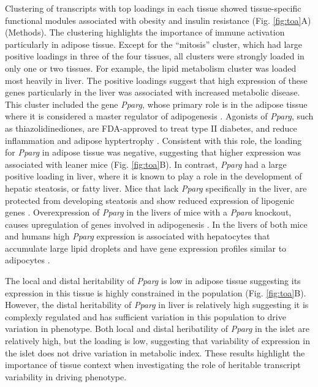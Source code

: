 \documentclass[
]{article}
\begin{document}
Clustering of transcripts with top loadings in each tissue showed
tissue-specific functional modules associated with obesity and insulin
resistance (Fig. \ref{fig:toa}A) (Methods). The clustering highlights
the importance of immune activation particularly in adipose tissue.
Except for the ``mitosis'' cluster, which had large positive loadings in
three of the four tissues, all clusters were strongly loaded in only one
or two tissues. For example, the lipid metabolism cluster was loaded
most heavily in liver. The positive loadings suggest that high
expression of these genes particularly in the liver was associated with
increased metabolic disease. This cluster included the gene
\textit{Pparg}, whose primary role is in the adipose tissue where it is
considered a master regulator of adipogenesis \cite{pmid17389767}.
Agonists of \textit{Pparg}, such as thiazolidinediones, are FDA-approved
to treat type II diabetes, and reduce inflammation and adipose
hyptertrophy \cite{pmid17389767}. Consistent with this role, the loading
for \textit{Pparg} in adipose tissue was negative, suggesting that
higher expression was associated with leaner mice (Fig. \ref{fig:toa}B).
In contrast, \textit{Pparg} had a large positive loading in liver, where
it is known to play a role in the development of hepatic steatosis, or
fatty liver. Mice that lack \textit{Pparg} specifically in the liver,
are protected from developing steatosis and show reduced expression of
lipogenic genes \cite{pmid12805374, pmid12618528}. Overexpression of
\textit{Pparg} in the livers of mice with a \textit{Ppara} knockout,
causes upregulation of genes involved in adipogenesis
\cite{pmid16357043}. In the livers of both mice and humans high
\textit{Pparg} expression is associated with hepatocytes that accumulate
large lipid droplets and have gene expression profiles similar to
adipocytes \cite{pmid15644454, pmid16403437}.

The local and distal heritability of \textit{Pparg} is low in adipose
tissue suggesting its expression in this tissue is highly constrained in
the population (Fig. \ref{fig:toa}B). However, the distal heritability
of \textit{Pparg} in liver is relatively high suggesting it is complexly
regulated and has sufficient variation in this population to drive
variation in phenotype. Both local and distal heribatility of
\textit{Pparg} in the islet are relatively high, but the loading is low,
suggesting that variability of expression in the islet does not drive
variation in metabolic index. These results highlight the importance of
tissue context when investigating the role of heritable transcript
variability in driving phenotype.
\end{document}
